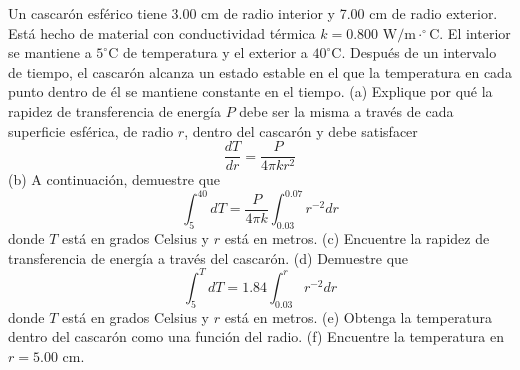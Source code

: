 \item Un cascarón esférico tiene 3.00 cm de radio interior y 7.00 cm de radio exterior. Está hecho de material con conductividad térmica $k = 0.800\text{ W/m}\cdot^\circ\text{C}$. El interior se mantiene a $5^\circ\text{C}$ de temperatura y el exterior a $40^\circ\text{C}$. Después de un intervalo de tiempo, el cascarón alcanza un estado estable en el que la temperatura en cada punto dentro de él se mantiene constante en el tiempo.
(a) Explique por qué la rapidez de transferencia de energía $P$ debe ser la misma a través de cada superficie esférica, de radio $r$, dentro del cascarón y debe satisfacer
$$ \frac{dT}{dr} = \frac{P}{4\pi k r^2} $$
(b) A continuación, demuestre que
$$ \int_{5}^{40} dT = \frac{P}{4\pi k} \int_{0.03}^{0.07} r^{-2} dr $$
donde $T$ está en grados Celsius y $r$ está en metros. 
(c) Encuentre la rapidez de transferencia de energía a través del cascarón. 
(d) Demuestre que
$$ \int_{5}^{T} dT = 1.84 \int_{0.03}^{r} r^{-2} dr $$
donde $T$ está en grados Celsius y $r$ está en metros. 
(e) Obtenga la temperatura dentro del cascarón como una función del radio. 
(f) Encuentre la temperatura en $r = 5.00\text{ cm}$.
